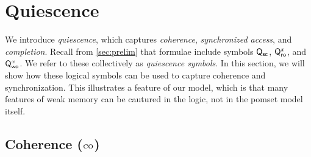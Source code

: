 \section{Quiescence}
\label{sec:q}

We introduce \emph{quiescence}, which captures \emph{coherence},
\emph{synchronized access}, and \emph{completion}.  Recall from
\textsection\ref{sec:prelim} that formulae include
symbols $\mathsf{Q}_{{\mathsf{sc}}}$, $\mathsf{Q}_{\mathsf{ro}}^{x}$, and $\mathsf{Q}_{\mathsf{wo}}^{x}$.
We refer to these collectively as \emph{quiescence symbols}.
In this section, we will show how these logical symbols can be used
to capture coherence and synchronization. This illustrates a feature
of our model, which is that many features of weak memory can be cautured
in the logic, not in the pomset model itself.

\subsection{Coherence (${\textsc{co}}$)}
\label{sec:co}

